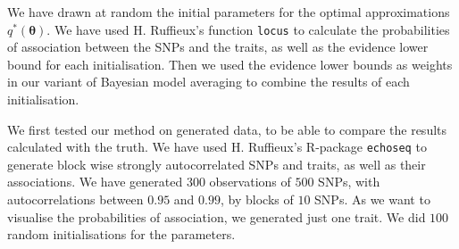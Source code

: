 \documentclass[a4paper, 11pt]{report}
\numberwithin{equation}{chapter}
\begin{document}
We have drawn at random the initial parameters for the optimal approximations $q^*(\boldsymbol{\theta})$. We have used H. Ruffieux's function \texttt{locus} to calculate the probabilities of association between the SNPs and the traits, as well as the evidence lower bound for each initialisation. Then we used the evidence lower bounds as weights in our variant of Bayesian model averaging to combine the results of each initialisation.

We first tested our method on generated data, to be able to compare the results calculated with the truth. We have used H. Ruffieux's R-package \texttt{echoseq} to generate block wise strongly autocorrelated SNPs and traits, as well as their associations. We have generated $300$ observations of $500$ SNPs, with autocorrelations between $0.95$ and $0.99$, by blocks of $10$ SNPs. As we want to visualise the probabilities of association, we generated just one trait. We did $100$ random initialisations for the parameters.
\end{document}
